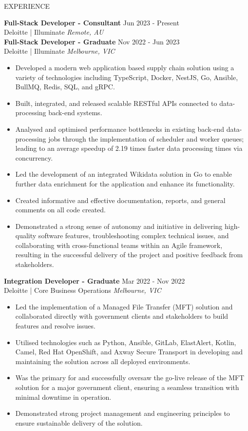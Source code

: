 \documentclass{resume} %
\begin{document}
\begin{rSection}{EXPERIENCE}

\textbf{Full-Stack Developer - Consultant} \hfill Jun 2023 - Present\\
Deloitte | Illuminate \hfill \textit{Remote, AU}\\
\textbf{Full-Stack Developer - Graduate} \hfill Nov 2022 - Jun 2023\\
Deloitte | Illuminate \hfill \textit{Melbourne, VIC}
 \begin{itemize}
    \itemsep -3pt {}
    \item Developed a modern web application based supply chain solution using a variety of technologies including TypeScript, Docker, NestJS, Go, Ansible, BullMQ, Redis, SQL, and gRPC.
    \item Built, integrated, and released scalable RESTful APIs connected to data-processing back-end systems.
    \item Analysed and optimised performance bottlenecks in existing back-end data-processing jobs through the implementation of scheduler and worker queues; leading to an average speedup of 2.19 times faster data processing times via concurrency.
    \item Led the development of an integrated Wikidata solution in Go to enable further data enrichment for the application and enhance its functionality.
    \item Created informative and effective documentation, reports, and general comments on all code created.
    \item Demonstrated a strong sense of autonomy and initiative in delivering high-quality software features, troubleshooting complex technical issues, and collaborating with cross-functional teams within an Agile framework, resulting in the successful delivery of the project and positive feedback from stakeholders.
 \end{itemize}

\textbf{Integration Developer - Graduate} \hfill Mar 2022 - Nov 2022\\
Deloitte | Core Business Operations \hfill \textit{Melbourne, VIC}
 \begin{itemize}
    \itemsep -3pt {}
    \item Led the implementation of a Managed File Transfer (MFT) solution and collaborated directly with government clients and stakeholders to build features and resolve issues.
    \item Utilised technologies such as Python, Ansible, GitLab, ElastAlert, Kotlin, Camel, Red Hat OpenShift, and Axway Secure Transport in developing and maintaining the solution across all deployed environments.
    \item Was the primary for and successfully oversaw the go-live release of the MFT solution for a major government client, ensuring a seamless transition with minimal downtime in operation.
    \item Demonstrated strong project management and engineering principles to ensure sustainable delivery of the solution.
 \end{itemize}


\end{rSection}
\end{document}
